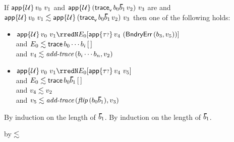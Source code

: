 \begin{lemma}\label{H-app-A-bnd}
  If\/ ${\mathsf{app}{\{{\mathcal U}\}}\,v_0~v_1}$
  and\/ ${\eapp{\tdyn}{(\ehist{\fconcat{\sbnd_0}{\sblist_1}}{\svalue_2})}{\svalue_3}}$
  are \reducedsurfaceexpressions{}
  and\/ $\rexpr{\eapp{\tdyn}{\svalue_0}{\svalue_1}}{\eapp{\tdyn}{(\ehist{\fconcat{\sbnd_0}{\sblist_1}}{\svalue_2})}{\svalue_3}}$
  then one of the following holds:
  \begin{itemize}
    \item
      \({\eapp{\tdyn}{\svalue_0}{\svalue_1}} \rredN \ctx_0[\eapp{\stoptional}{\svalue_4}{(\boundaryerror{\sbnd_3}{\svalue_5})}]\)
      \\and\/ \(E_0 \lesssim \mathsf{trace}\,b_0\cdots b_i\,{[\,]}\)
      \\and\/ \(v_4 \lesssim \textit{add\textsf{-}trace}\,(b_i\cdots b_n, v_2)\)
    \item
      \( {\eapp{\tdyn}{\svalue_0}{\svalue_1}} \rredN \ctx_0[\eapp{\stoptional}{\svalue_4}{\svalue_5}] \)
      \\and\/ \( \rctx{\ctx_0}{\eprehist{\fconcat{\sbnd_0}{\sblist_1}}{\ctxhole}} \)
      \\and\/ \( v_4 \lesssim v_2 \)
      \\and\/ \( \rexpr{\svalue_5}{\faddtrace{\fflip{\fconcat{\sbnd_0}{\sblist_1}}}{\svalue_3}} \)
  \end{itemize}
\end{lemma}{
  \newcommand{\shortpf}{By induction on the length of $\sblist_1$.}
\begin{lamportproof*}
  \shortpf
\mainproof
  \shortpf

    \begin{pfproof}
      \absurdstep
        \begin{pfproof}
          by $\lesssim$
        \end{pfproof}
    \end{pfproof}


\end{lamportproof*}}

